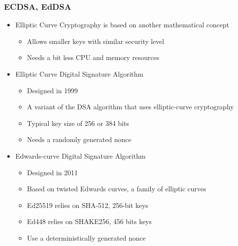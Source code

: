 \begin{frame}
  \frametitle{ECDSA, EdDSA}
  \begin{itemize}
    \item Elliptic Curve Cryptography is based on another mathematical concept
      \begin{itemize}
        \item Allows smaller keys with similar security level
        \item Needs a bit less CPU and memory resources
      \end{itemize}
    \item Elliptic Curve Digital Signature Algorithm
      \begin{itemize}
        \item Designed in 1999
        \item A variant of the DSA algorithm that uses elliptic-curve cryptography
        \item Typical key size of 256 or 384 bits
        \item Needs a randomly generated nonce
      \end{itemize}
    \item Edwards-curve Digital Signature Algorithm
      \begin{itemize}
        \item Designed in 2011
        \item Based on twisted Edwards curves, a family of elliptic curves
        \item Ed25519 relies on SHA-512, 256-bit keys
        \item Ed448 relies on SHAKE256, 456 bits keys
        \item Use a deterministically generated nonce
      \end{itemize}
  \end{itemize}
\end{frame}

